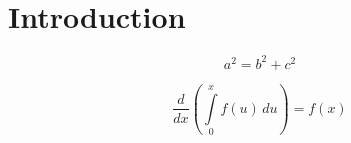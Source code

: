 \chapter{Introduction}
\lipsum[1]
\begin{equation}
	a^2 = b^2 + c^2
\end{equation}

\lipsum[2]
\begin{equation}
	\frac{d}{dx}\left( \int\limits_{0}^{x} f(u)\,du\right)=f(x)
\end{equation}
